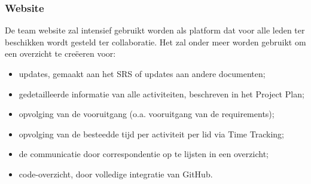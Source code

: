 \subsubsection{Website}
De team website zal intensief gebruikt worden als platform dat voor alle leden ter beschikken wordt gesteld ter collaboratie. Het zal onder meer worden gebruikt om een overzicht te cre\"{e}eren voor:
\begin{itemize}
 \item updates, gemaakt aan het SRS of updates aan andere documenten;
 \item gedetailleerde informatie van alle activiteiten, beschreven in het Project Plan;
 \item opvolging van de vooruitgang (o.a. vooruitgang van de requirements);
 \item opvolging van de besteedde tijd per activiteit per lid via Time Tracking;
 \item de communicatie door correspondentie op te lijsten in een overzicht;
 \item code-overzicht, door volledige integratie van GitHub. 
\end{itemize}

